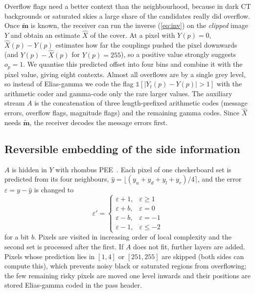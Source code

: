 Overflow flags need a better context than the neighbourhood, because in dark CT backgrounds or saturated skies a large
share of the candidates really did overflow. Once $\tilde{\mathbf m}$ is known, the receiver can run the inverse
(\ref{eq:inv}) on the \emph{clipped} image $Y$ and obtain an estimate $\hat X$ of the cover. At a pixel with $Y(p)=0$,
$\hat X(p)-Y(p)$ estimates how far the couplings pushed the pixel downwards (and $Y(p)-\hat X(p)$ for $Y(p)=255$), so a
positive value strongly suggests $o_p=1$. We quantise this predicted offset into four bins and combine it with the pixel
value, giving eight contexts. Almost all overflows are by a single grey level, so instead of Elias-gamma we code the flag
$\mathbb 1[|Y_t(p)-Y(p)|>1]$ with the arithmetic coder and gamma-code only the rare larger values. The auxiliary stream
$A$ is the concatenation of three length-prefixed arithmetic codes (message errors, overflow flags, magnitude flags) and
the remaining gamma codes. Since $\hat X$ needs $\tilde{\mathbf m}$, the receiver decodes the message errors first.

\subsection{Reversible embedding of the side information}
$A$ is hidden in $Y$ with rhombus PEE~\cite{sachnev2009}. Each pixel of one checkerboard set is predicted from its four
neighbours, $\hat y=\lfloor(y_u+y_d+y_l+y_r)/4\rceil$, and the error $\varepsilon=y-\hat y$ is changed to
\begin{equation}
\varepsilon'=\begin{cases}\varepsilon+1,&\varepsilon\ge1\\ \varepsilon+b,&\varepsilon=0\\ \varepsilon-b,&\varepsilon=-1\\
\varepsilon-1,&\varepsilon\le-2\end{cases}
\end{equation}
for a bit $b$. Pixels are visited in increasing order of local complexity and the second set is processed after the
first. If $A$ does not fit, further layers are added. Pixels whose prediction lies in $[1,4]$ or $[251,255]$ are skipped
(both sides can compute this), which prevents noisy black or saturated regions from overflowing; the few remaining
risky pixels are moved one level inwards and their positions are stored Elias-gamma coded in the pass header.

